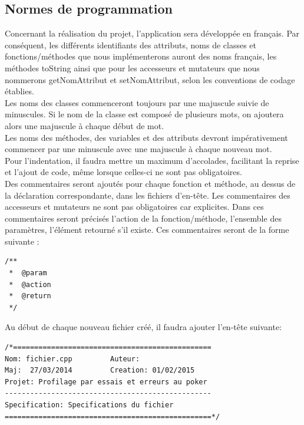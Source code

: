 \documentclass{report}
\begin{document}
\subsection{Normes de programmation}
\hspace{0.5cm}Concernant la réalisation du projet, l'application sera développée en français. Par conséquent, les différents identifiants des attributs, noms de classes et fonctions/méthodes que nous implémenterons auront des noms français, les méthodes toString ainsi que pour les accesseurs et mutateurs que nous nommerons getNomAttribut et setNomAttribut, selon les conventions de codage établies.\\

Les noms des classes commenceront toujours par une majuscule suivie de minuscules. Si le nom de la classe est composé de plusieurs mots, on ajoutera alors une majuscule à chaque début de mot.\\

Les noms des méthodes, des variables et des attributs devront impérativement commencer par une minuscule avec une majuscule à chaque nouveau mot.\\

Pour l'indentation, il faudra mettre un maximum d'accolades, facilitant la reprise et l'ajout de code, même lorsque celles-ci ne sont pas obligatoires.\\

Des commentaires seront ajoutés pour chaque fonction et méthode, au dessus de la déclaration correspondante, dans les fichiers d'en-tête. Les commentaires des accesseurs et mutateurs ne sont pas obligatoires car explicites.
Dans ces commentaires seront précisés l'action de la fonction/méthode, l'ensemble des paramètres, l'élément retourné s'il existe. Ces commentaires seront de la forme suivante : \par

\begin{lstlisting}
/**
 *  @param
 *  @action
 *  @return
 */
\end{lstlisting}

Au début de chaque nouveau fichier créé, il faudra ajouter l'en-tête suivante: 
\begin{lstlisting}
/*===============================================
Nom: fichier.cpp         Auteur: 
Maj:  27/03/2014         Creation: 01/02/2015
Projet: Profilage par essais et erreurs au poker
-------------------------------------------------
Specification: Specifications du fichier
=================================================*/
\end{lstlisting}
\end{document}

